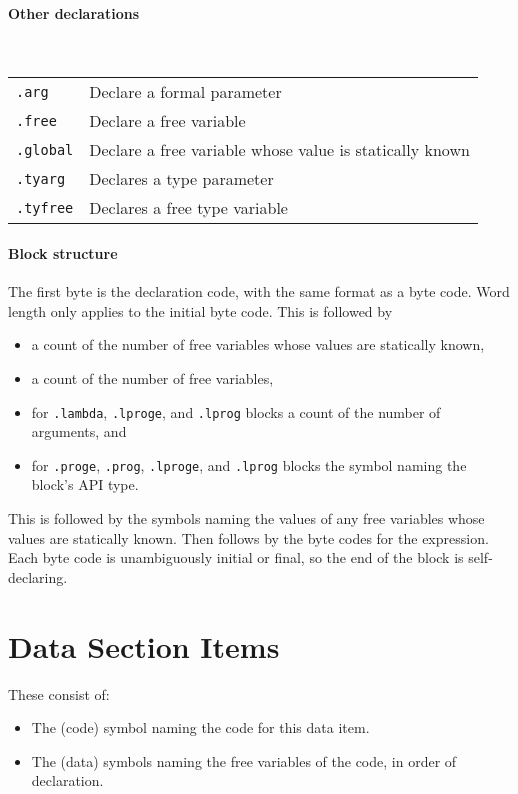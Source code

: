 \documentclass{article}
\begin{document}
\paragraph{Other declarations}\

\begin{tabular}{l@{ --- }l}
  \texttt{.arg} & Declare a formal parameter \\
  \texttt{.free} & Declare a free variable \\
  \texttt{.global} & Declare a free variable whose value is statically known \\
  \texttt{.tyarg} & Declares a type parameter \\
  \texttt{.tyfree} & Declares a free type variable \\
\end{tabular}

\paragraph{Block structure}

The first byte is the declaration code, with the same format as a byte code.
Word length only applies to the initial byte code.
This is followed by
\begin{itemize}
\item a count of the number of free variables whose values are statically known,
\item a count of the number of free variables,
\item for \texttt{.lambda}, \texttt{.lproge}, and \texttt{.lprog} blocks a count of the number of arguments, and
\item for \texttt{.proge}, \texttt{.prog}, \texttt{.lproge}, and \texttt{.lprog} blocks the symbol naming the block's API type.
\end{itemize}
This is followed by the symbols naming the values of any free variables whose values are statically known.
Then follows by the byte codes for the expression.
Each byte code is unambiguously initial or final, so the end of the block is self-declaring.

\section{Data Section Items}

These consist of:
\begin{itemize}
    \item The (code) symbol naming the code for this data item.
    \item The (data) symbols naming the free variables of the code, in order of declaration.
\end{itemize}
\end{document}
